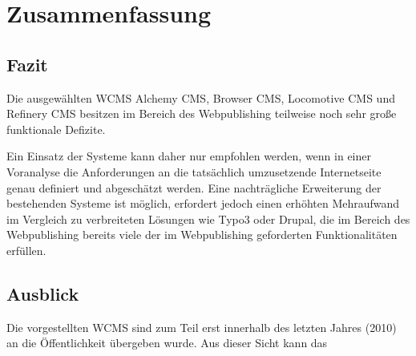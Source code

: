 \chapter{Zusammenfassung}

\section{Fazit}
Die ausgewählten WCMS Alchemy CMS, Browser CMS, Locomotive CMS und Refinery CMS besitzen im Bereich des Webpublishing teilweise noch sehr große funktionale Defizite.

Ein Einsatz der Systeme kann daher nur empfohlen werden, wenn in einer Voranalyse die Anforderungen an die tatsächlich umzusetzende Internetseite genau definiert und abgeschätzt werden. Eine nachträgliche Erweiterung der bestehenden Systeme ist möglich, erfordert jedoch einen erhöhten Mehraufwand im Vergleich zu verbreiteten Lösungen wie Typo3 oder Drupal, die im Bereich des Webpublishing bereits viele der im Webpublishing geforderten Funktionalitäten erfüllen.



\section{Ausblick}
Die vorgestellten WCMS sind zum Teil erst innerhalb des letzten Jahres (2010) an die Öffentlichkeit übergeben wurde. Aus dieser Sicht kann das
